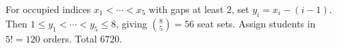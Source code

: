 For occupied indices $x_1<\cdots<x_5$ with gaps at least 2, set $y_i=x_i-(i-1)$. Then $1\le y_1<\cdots<y_5\le8$, giving $\binom85=56$ seat sets. Assign students in $5!=120$ orders. Total $\boxed{6720}$.

